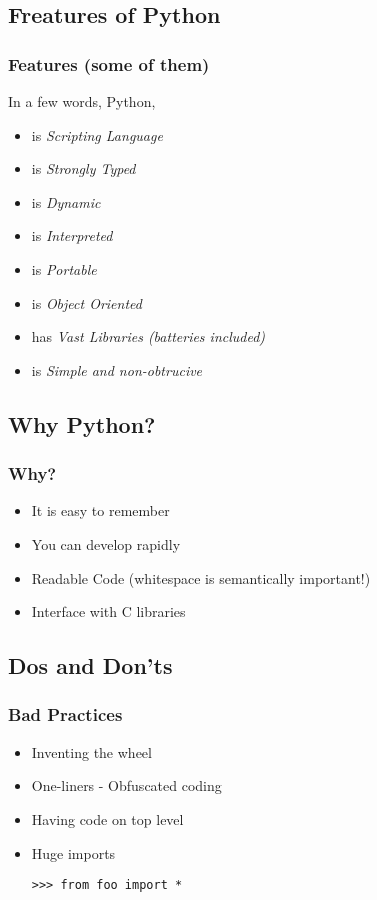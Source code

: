\documentclass{beamer}
\begin{document}
\subsection{Freatures of Python}
\begin{frame}
    \frametitle{Features (some of them)}

    In a few words, Python,
    \begin{itemize}
        \item<1-> is \emph{Scripting Language}
        \item<2-> is \emph{Strongly Typed}
        \item<3-> is \emph{Dynamic}
        \item<4-> is \emph{Interpreted}
        \item<5-> is \emph{Portable}
        \item<6-> is \emph{Object Oriented}
        \item<7-> has \emph{Vast Libraries (batteries included)}
        \item<8-> is \emph{Simple and non-obtrucive}
    \end{itemize}

\end{frame}

\subsection{Why Python?}
\begin{frame}
    \frametitle{Why?}
    \begin{itemize}
        \item<1-> It is easy to remember
        \item<2-> You can develop rapidly
        \item<3-> Readable Code (whitespace is semantically important!)
        \item<4-> Interface with C libraries
    \end{itemize}
\end{frame}
\subsection{Dos and Don'ts}

\begin{frame}[fragile]
    \frametitle{Bad Practices}

    \begin{itemize}
        \item<1-> Inventing the wheel
        \item<2-> One-liners - Obfuscated coding
        \item<3-> Having code on top level
        \item<4-> Huge imports
            \begin{verbatim}
>>> from foo import *
            \end{verbatim}
    \end{itemize}

\end{frame}
\end{document}
